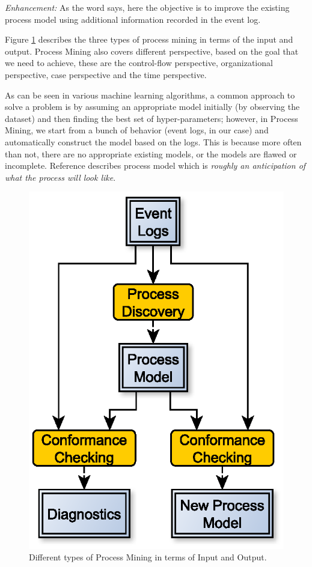 \textit{Enhancement:} As the word says, here the objective is to improve the existing process model using additional information recorded in the event log.

Figure \ref{fig:ProcessMiningInputOutput} describes the three types of process mining in terms of the input and output. Process Mining also covers different perspective, based on the goal that we need to achieve, these are the control-flow perspective, organizational perspective, case perspective and the time perspective. 

As can be seen in various machine learning algorithms, a common approach to solve a problem is by assuming an appropriate model initially (by observing the dataset) and then finding the best set of hyper-parameters; however, in Process Mining, we start from a bunch of behavior (event logs, in our case) and automatically construct the model based on the logs. This is because more often than not, there are no appropriate existing models, or the models are flawed or incomplete. Reference\cite{Rolland1998} describes process model which is \textit{roughly an anticipation of what the process will look like}. 

\begin{figure}[h]
	\centering
	\includegraphics[width=0.6\columnwidth]{images/procesMiningInputOutput.eps}
	\caption{Different types of Process Mining in terms of Input and Output.}
	\label{fig:ProcessMiningInputOutput}
\end{figure}

